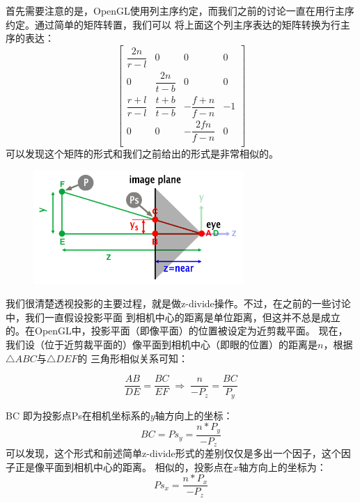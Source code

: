 \documentclass[12pt]{article}
\begin{document}
\indent{}首先需要注意的是，OpenGL使用列主序约定，而我们之前的讨论一直在用行主序约定。通过简单的矩阵转置，我们可以
将上面这个列主序表达的矩阵转换为行主序的表达：
\begin{displaymath}
\left[\begin{array}{cccc}
{ \dfrac{2n}{ r-l } } & 0 & 0 & 0 \\
0 & { \dfrac{2n}{ t-b } } & 0 & 0 \\
{ \dfrac{r + l}{ r-l } } & { \dfrac{t + b}{ t-b } } & -{\dfrac{f+n}{f-n}} & {-1}\\
0 & 0 & -{\dfrac{2fn}{f-n}}& 0\\
\end{array}\right]
\end{displaymath}
\noindent{}可以发现这个矩阵的形式和我们之前给出的形式是非常相似的。

\begin{figure}[h]
\centering
\includegraphics[width=8cm]{./imgs/projectionOpenGL.png}
\end{figure}

\indent{}我们很清楚透视投影的主要过程，就是做z-divide操作。不过，在之前的一些讨论中，我们一直假设投影平面
到相机中心的距离是单位距离，但这并不总是成立的。在OpenGL中，投影平面（即像平面）的位置被设定为近剪裁平面。
现在，我们设（位于近剪裁平面的）像平面到相机中心（即眼的位置）的距离是$n$，根据$\triangle ABC$与$\triangle DEF$的
三角形相似关系可知：

\begin{displaymath}
\frac{AB}{DE} = \frac{BC}{EF} \;\Rightarrow\; \frac{n}{-P_z} = \frac{BC}{P_y}
\end{displaymath}

\noindent{}BC 即为投影点Ps在相机坐标系的$y$轴方向上的坐标：
\begin{displaymath}
BC = Ps_{y} = \frac{n*P_y}{-P_z}
\end{displaymath}
可以发现，这个形式和前述简单z-divide形式的差别仅仅是多出一个因子，这个因子正是像平面到相机中心的距离。
相似的，投影点在$x$轴方向上的坐标为：
\begin{displaymath}
Ps_x = \frac{n*P_x}{-P_z}
\end{displaymath}
\end{document}
